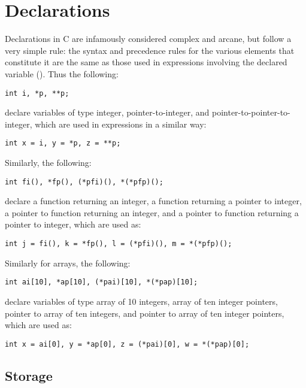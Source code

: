 \section{Declarations}

Declarations in C are infamously considered complex and arcane, but follow a
very simple rule: the syntax and precedence rules for the various elements that
constitute it are the same as those used in expressions involving the declared
variable (\cite{Ritchie1996}).  Thus the following:

\begin{lstlisting}[style=c]
int i, *p, **p;
\end{lstlisting}

declare variables of type integer, pointer-to-integer, and
pointer-to-pointer-to-integer, which are used in expressions in a similar way:

\begin{lstlisting}[style=c]
int x = i, y = *p, z = **p;
\end{lstlisting}

Similarly, the following:

\begin{lstlisting}[style=c]
int fi(), *fp(), (*pfi)(), *(*pfp)();
\end{lstlisting}

declare a function returning an integer, a function returning a
pointer to integer, a pointer to function returning an integer, and a pointer to
function returning a pointer to integer, which are used as:

\begin{lstlisting}[style=c]
int j = fi(), k = *fp(), l = (*pfi)(), m = *(*pfp)();
\end{lstlisting}

Similarly for arrays, the following:

\begin{lstlisting}[style=c]
int ai[10], *ap[10], (*pai)[10], *(*pap)[10];
\end{lstlisting}

declare variables of type array of 10 integers, array of ten integer pointers,
pointer to array of ten integers, and pointer to array of ten integer pointers,
which are used as:

\begin{lstlisting}[style=c]
int x = ai[0], y = *ap[0], z = (*pai)[0], w = *(*pap)[0];
\end{lstlisting}

\subsection{Storage}

